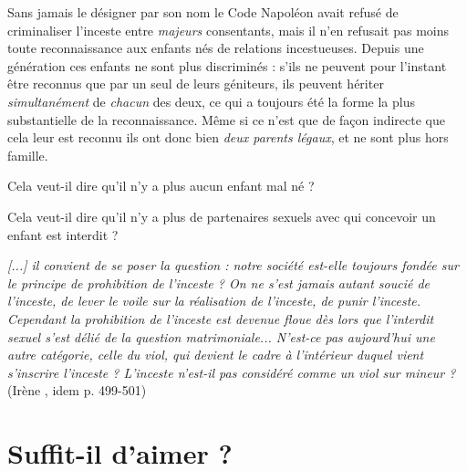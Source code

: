 Sans jamais le désigner par son nom le Code Napoléon avait refusé de criminaliser l'inceste entre \emph{majeurs} consentants, mais il n'en refusait pas moins toute reconnaissance aux enfants nés de relations incestueuses. Depuis une génération ces enfants ne sont plus discriminés : s'ils ne peuvent pour l'instant être reconnus que par un seul de leurs géniteurs, ils peuvent hériter \emph{simultanément}
 de \emph{chacun} des deux, ce qui a toujours été la forme la plus substantielle de la reconnaissance. Même si ce n'est que de façon indirecte que cela leur est reconnu ils ont donc bien  \emph{deux parents légaux}, et ne sont plus hors famille. 
 
 
 
 Cela veut-il dire qu'il n'y a plus aucun enfant mal né ? 
 
 Cela veut-il dire qu'il n'y a plus de partenaires sexuels avec qui concevoir un enfant est interdit ? 
 
 
 
 \begin{displayquote} 
\emph{[...] il convient de se poser la question : notre société est-elle toujours fondée sur le principe de prohibition de l'inceste ? On ne s'est jamais autant soucié de l'inceste, de lever le voile sur la réalisation de l'inceste, de punir l'inceste. Cependant la prohibition de l'inceste est devenue floue dès lors que l'interdit sexuel s'est délié de la question matrimoniale... N'est-ce pas aujourd'hui une autre catégorie, celle du viol, qui devient le cadre à l'intérieur duquel vient s'inscrire l'inceste ? L'inceste n'est-il pas considéré comme un viol sur mineur ?}
 (Irène , idem p. 499-501)
 \end{displayquote} 
 
 \section{Suffit-il d'aimer ?} 

